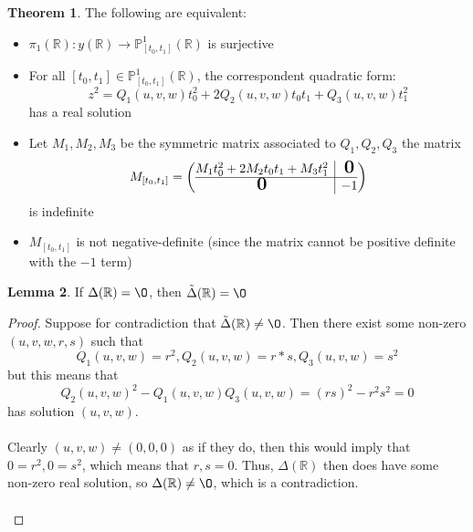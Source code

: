 \documentclass{article}
\newcommand{\bigzero}{\mbox{\normalfont\Large\bfseries 0}}
\newcommand{\Rbb}{\mathbb{R}}
\newcommand{\Pbb}{\mathbb{P}}
\begin{document}
\theoremstyle{definition}
\newtheorem{theorem}{Theorem}[section]
\theoremstyle{definition}
\newtheorem{conjecture}[theorem]{Conjecture}
\theoremstyle{definition}
\newtheorem{definition}[theorem]{Definition}
\theoremstyle{definition}
\newtheorem{goal}[theorem]{Goal}
\theoremstyle{definition}
\newtheorem{corollary}[theorem]{Corollary}
\theoremstyle{definition}
\newtheorem{question}[theorem]{Question}
\theoremstyle{definition}
\newtheorem{lemma}[theorem]{Lemma}
\theoremstyle{definition}
\newtheorem{proposition}[theorem]{Proposition}

\begin{theorem}
The following are equivalent:
\begin{itemize}
    \item $\pi_1(\Rbb): y(\Rbb) \to \Pbb^{1}_{[t_0, t_1]}(\Rbb)$ is surjective
    \item For all $[t_0, t_1] \in \Pbb^{1}_{[t_0, t_1]}(\Rbb)$, the correspondent quadratic form:
    \[z^2 = Q_1(u, v, w)t_0^2 + 2Q_2(u, v, w)t_0 t_1 + Q_3(u, v, w) t_1^2\]
    has a real solution
    \item Let $M_1, M_2, M_3$ be the symmetric matrix associated to $Q_1, Q_2, Q_3$ the matrix 
    \[M_{[t_0, t_1]} = 
\left(\begin{array}{@{}c|c@{}}
  \begin{matrix}
    M_1t_0^2 + 2M_2t_0t_1 + M_3t_1^2
  \end{matrix}
  & \bigzero \\
\hline
  \bigzero &
  \begin{matrix}
  -1
  \end{matrix}
\end{array}\right)
\]
    is indefinite
    \item $M_{[t_0, t_1]}$ is not negative-definite (since the matrix cannot be positive definite with the $-1$ term)
\end{itemize}
\end{theorem}

\begin{lemma}
If $\Delta(\Rbb) = \O$, then $\Tilde{\Delta}(\Rbb) = \O$
\end{lemma}

\begin{proof}
Suppose for contradiction that $\Tilde{\Delta}(\Rbb) \neq \O$. Then there exist some non-zero $(u, v, w, r, s)$ such that
\[Q_1(u, v, w) = r^2, Q_2(u, v, w) = r*s, Q_3(u, v, w) = s^2\]
but this means that
\[Q_2(u, v, w)^2 - Q_1(u, v, w)Q_3(u, v, w) = (rs)^2 - r^2s^2 = 0\]
has solution $(u, v, w)$.\\\\
Clearly $(u, v, w) \neq (0, 0, 0)$ as if they do, then this would imply that $0 = r^2, 0 = s^2$, which means that $r, s = 0$. Thus, $\Delta(\Rbb)$ then does have some non-zero real solution, so $\Delta(\Rbb) \neq \O$, which is a contradiction.\\\\
\end{proof}
\end{document}
